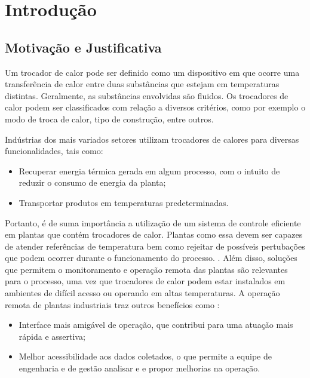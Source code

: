 \chapter{Introdução}
	
	\section{Motivação e Justificativa}

	Um trocador de calor pode ser definido como um dispositivo em que ocorre uma transferência de calor entre duas substâncias que estejam em temperaturas distintas. Geralmente, as substâncias envolvidas são fluidos. Os trocadores de calor podem ser classificados com relação a diversos critérios, como por exemplo o modo de troca de calor, tipo de construção, entre outros. \cite{kreith2011}
	
	Indústrias dos mais variados setores utilizam trocadores de calores para diversas funcionalidades, tais como:
	
	\begin{itemize}
		\item 
		Recuperar energia térmica gerada em algum processo, com o intuito de reduzir o consumo de energia da planta;
		\item 
		Transportar produtos em temperaturas predeterminadas.
	\end{itemize}

	Portanto, é de suma importância a utilização de um sistema de controle eficiente em plantas que contém trocadores de calor. Plantas como essa devem ser capazes de atender referências de temperatura bem como rejeitar de possíveis pertubações que podem ocorrer durante o funcionamento do processo. \cite{novazzi2007}. Além disso, soluções que permitem o monitoramento e operação remota das plantas são relevantes para o processo, uma vez que trocadores de calor podem estar instalados em ambientes de difícil acesso ou operando em altas temperaturas. A operação remota de plantas industriais traz outros benefícios como \cite{babau2009}:
	\begin{itemize}
		\item 
		Interface mais amigável de operação, que contribui para uma atuação mais rápida e assertiva;
		\item 
		Melhor acessibilidade aos dados coletados, o que permite a equipe de engenharia e de gestão analisar e e propor melhorias na operação.
	\end{itemize}

